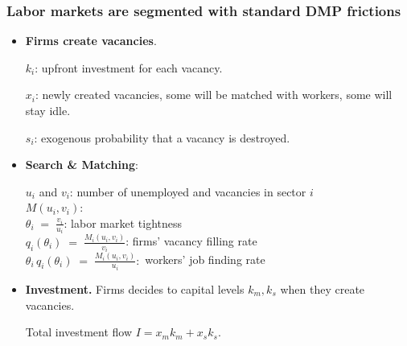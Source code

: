 \documentclass[9pt,xcolor={svgnames}]{beamer}
\begin{document}
\begin{frame}
\frametitle{Labor markets are segmented with standard DMP frictions}
\vspace{1em}
 \begin{itemize}

  


    \vspace{1em}

\item  \textbf{Firms create vacancies}.

   $k_i$: upfront investment for each vacancy.

  $x_i$: newly created vacancies, some will be matched with workers, some will stay idle.


    $s_i$: exogenous probability that a vacancy is destroyed. \\

  \vspace{3mm}

    
    \item \textbf{Search \& Matching}:    
      
  $ u_i$ and $v_i$:   \quad number of unemployed and vacancies in sector $i$\\
  \vspace{1mm}
    $ M(u_i,v_i)$: \quad {}  \\
\vspace{1mm}
       $ \theta_i \;=\; \frac{v_i}{u_i}$: \quad  labor market tightness \\
       \vspace{1mm}
       $ q_i(\theta_i) \;=\; \frac{M_i(u_i,v_i)}{v_i}$: \quad  firms' vacancy filling rate\\
       \vspace{1mm}
      $  \theta_i\,q_i(\theta_i) \;=\;\frac{M_i(u_i,v_i)}{u_i}:$ \quad 
      workers' job finding rate \\


\vspace{1mm}
      \vspace{1mm}
      
       

         \vspace{5mm}





\item \textbf{Investment.} Firms decides to capital levels $k_m, k_s$ when they create vacancies. 

Total investment flow $I = x_mk_m + x_sk_s$.
  \end{itemize}
\end{frame}
\end{document}

